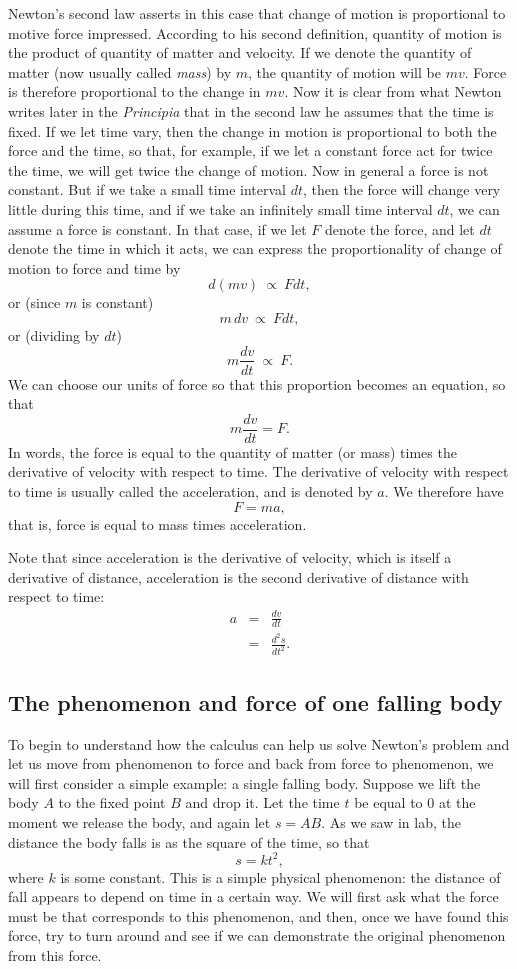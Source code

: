 \documentclass[twoside,openright]{article}
\begin{document}
Newton's second law asserts in this case that change of motion is
proportional to motive force impressed.  According to his second
definition, quantity of motion is the product of quantity of matter
and velocity.  If we denote the quantity of matter (now usually called
{\em mass}) by $m$, the quantity of motion will be $mv$.  Force is
therefore proportional to the change in $mv$.  Now it is clear from
what Newton writes later in the {\em Principia} that in the second law
he assumes that the time is fixed.  If we let time vary, then the
change in motion is proportional to both the force and the time,
so that, for example, if we let a constant force act for twice the
time, we will get twice the change of motion.  Now in general a force
is not constant.  But if we take a small time interval $dt$, then the
force will change very little during this time, and if we take an
infinitely small time interval $dt$, we can assume a force is
constant.  In that case, if we let $F$ denote the force, and let $dt$
denote the time in which it acts, we can express the proportionality
of change of motion to force and time by
$$d(mv)\: \propto\: Fdt,$$
or (since $m$ is constant)
$$m\,dv\: \propto\: Fdt,$$
or (dividing by $dt$)
$$m\frac{dv}{dt}\: \propto\: F.$$
We can choose our units of force so that this proportion becomes an
equation, so that
$$m\frac{dv}{dt} = F.$$
In words, the force is equal to the quantity of matter (or mass) times
the derivative of velocity with respect to time.  The derivative of
velocity with respect to time is usually called the acceleration, and
is denoted by $a$.  We therefore have
$$F = ma,$$
that is, force is equal to mass times acceleration.

Note that since acceleration is the derivative of velocity, which is
itself a derivative of distance, acceleration is the second derivative
of distance with respect to time:
\begin{eqnarray*}
  a & = & \frac{dv}{dt}\\
    & = & \frac{d^2s}{dt^2}.
\end{eqnarray*}

\subsection*{The phenomenon and force of one falling body}
To begin to understand how the calculus can help us solve Newton's
problem and let us move from phenomenon to force and back from force
to phenomenon, we will first consider a simple example: a single
falling body.  Suppose we lift the body $A$ to the fixed point $B$ and
drop it.  Let the time $t$ be equal to $0$ at the moment we release
the body, and again let $s=AB$.  As we saw in lab, the distance the
body falls is as the square of the time, so that
$$s = kt^2,$$
where $k$ is some constant.  This is a simple physical phenomenon: the
distance of fall appears to depend on time in a certain way.  We will
first ask what the force must be that corresponds to this phenomenon,
and then, once we have found this force, try to turn around and see if
we can demonstrate the original phenomenon from this
force.\vspace{2ex}
\end{document}
